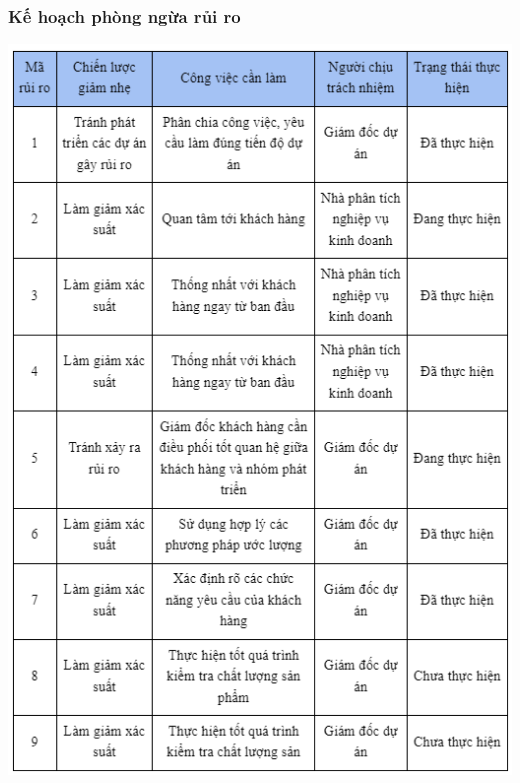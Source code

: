 \documentclass[12pt]{article}
\begin{document}
\subsubsection{Kế hoạch phòng ngừa rủi ro}
\includegraphics[width=15cm]{II_7_5_1.png}
\par
\end{document}
